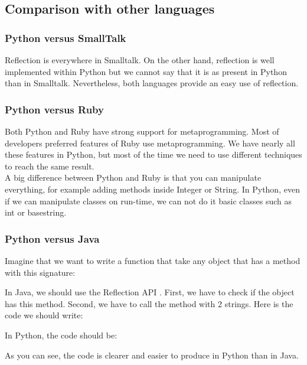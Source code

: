 \subsection{Comparison with other languages}

\subsubsection{Python versus SmallTalk}
Reflection is everywhere in Smalltalk. On the other hand, reflection is well implemented within Python but we cannot say that it is as present in Python than in Smalltalk. Nevertheless, both languages provide an easy use of reflection.

\subsubsection{Python versus Ruby}
\label{ruby_vs_python}
Both Python and Ruby have strong support for metaprogramming. 
Most of developers preferred features of Ruby use metaprogramming. 
We have nearly all these features in Python, but most of the time we need to use different techniques to reach the same result.\\

A big difference between Python and Ruby is that you can manipulate everything, for example adding methods inside Integer or String. In Python, even if we can manipulate classes on run-time, we can not do it basic classes such as int or basestring.\\



\subsubsection{Python versus Java}
Imagine that we want to write a function that take any object that has a method with this signature:


In Java, we should use the Reflection API \cite{python_more_fun_java}. First, we have to check if the object has this method. Second, we have to call the method with 2 strings. Here is the code we should write:


In Python, the code should be:


As you can see, the code is clearer and easier to produce in Python than in Java.
